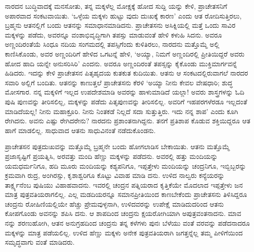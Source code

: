 ನಾರದನ ಬುದ್ಧಿವಾದಕ್ಕೆ ಮನಸೋತು, ತನ್ನ ಮಕ್ಕಳೆಲ್ಲ ಮೋಕ್ಷಕ್ಕೆ ಹೋದ ಸುದ್ದಿ ಯನ್ನು ಕೇಳಿ, ಪ್ರಾಚೇತಸನಿಗೆ ಅಪಾರವಾದ ಸಂಕಟವಾಯಿತು. ‘ಒಳ್ಳೆಯ ಮಕ್ಕಳು ಹುಟ್ಟು ವುದು ದುಃಖಕ್ಕೆ ಕಾರಣ’ ಎಂದು ಆತ ರೋದಿಸುತ್ತಿರಲು, ಬ್ರಹ್ಮನು ಆತನಲ್ಲಿಗೆ ಬಂದು ಆತನನ್ನು ಸಮಾಧಾನಮಾಡಿದನು. ಪ್ರಾಚೇತಸನು ಅಸಿಕ್ನಿಯಲ್ಲಿ ಮತ್ತೆ ಒಂದು ಸಾವಿರ ಮಕ್ಕಳನ್ನು ಪಡೆದು, ಅವರನ್ನೂ ವಂಶಾಭಿವೃದ್ಧಿಗಾಗಿ ತಪಸ್ಸು ಮಾಡುವಂತೆ ಹೇಳಿ ಕಳುಹಿ ಸಿದನು. ಅವರೂ ಅಣ್ಣಂದಿರಂತೆಯೆ ಸಿಂಧೂ ನದಿಯ ಸಂಗಮದಲ್ಲಿ ತಪಸ್ಸಿಗೆಂದು ಕುಳಿತಿರಲು, ನಾರದನು ಮತ್ತೊಮ್ಮೆ ಅಲ್ಲಿ ಕಾಣಿಸಿಕೊಂಡು, ಅವರ ಅಣ್ಣಂದಿರಿಗೆ ಹೇಳಿದ ಒಗಟನ್ನೆ ಹೇಳಿ, ‘ಅಯ್ಯಾ, ನಿಮಗೆ ಅಣ್ಣಂದಿರಲ್ಲಿ ಪ್ರೀತಿಯಿದ್ದರೆ ಅವರು ಹೋದ ಹಾದಿ ಯನ್ನೇ ಅನುಸರಿಸಿರಿ’ ಎಂದನು. ಅವರೂ ಅಣ್ಣಂದಿರಂತೆ ತಪಸ್ಸನ್ನು ಕೈಕೊಂಡು ಮುಕ್ತಿಮಾರ್ಗವನ್ನೆ ಹಿಡಿದರು. ಇದನ್ನು ಕೇಳಿ ಪ್ರಾಚೇತಸನ ಪಿತೃಹೃದಯ ಕುತಕುತ ಕುದಿಯಿತು. ಆತನು ಆ ಸಂಕಟದಲ್ಲಿರುವಾಗಲೆ ನಾರದರ ಸವಾರಿ ಅಲ್ಲಿಗೆ ಬಂದಿತು. ಆತನನ್ನು ಕಾಣುತ್ತಲೆ ಪ್ರಾಚೇತಸನು ಕೆರಳಿ ‘ಅಯ್ಯಾ ನೀನು ಕೇವಲ ವೇಷಧಾರಿ; ಶುದ್ಧ ಮೋಸಗಾರ. ನನ್ನ ಮಕ್ಕಳಿಗೆ ಇಲ್ಲದ ಉಪದೇಶಮಾಡಿ ಅವರನ್ನು ಹಾಳುಮಾಡಿದೆ ಯಲ್ಲಾ! ಅವರು ಶಾಸ್ತ್ರಗಳನ್ನು ಓದಿ ಪುಷಿ ಪುಣವನ್ನು ತೀರಿಸಲಿಲ್ಲ, ಮಕ್ಕಳನ್ನು ಪಡೆದು ಪಿತೃಪುಣವನ್ನು ತೀರಿಸಲಿಲ್ಲ. ಅವರಿಗೆ ಇಹಪರಗಳೆರಡೂ ಇಲ್ಲದಂತೆ ಮಾಡಿದೆಯಲ್ಲ! ನೀನು ಮಹಾಕ್ರೂರಿ. ನೀನು ನಿಂತಕಡೆ ನಿಲ್ಲದೆ ಸದಾ ಸುತ್ತುತ್ತಿರು. ಇದು ನನ್ನ ಶಾಪ’ ಎಂದು ಕೂಗಿ ರೇಗಿದನು. ಅವನು ಎಷ್ಟು ರೇಗಿದರೇನು? ನಾರದನು ಪ್ರಶಾಂತನಾಗಿದ್ದನು. ತನಗೆ ಪ್ರತಿಶಾಪ ಕೊಡುವ ಶಕ್ತಿಯಿದ್ದರೂ ಆತ ಹಾಗೆ ಮಾಡಲಿಲ್ಲ. ಸಾಧುವಾದ ಆತನು ಸಾಧುವಿನಂತೆ ನಡೆದುಕೊಂಡನು.

ಪ್ರಾಚೇತಸನ ಪುತ್ರದುಃಖವನ್ನು ಮತ್ತೊಮ್ಮೆ ಬ್ರಹ್ಮನೇ ಬಂದು ಹೋಗಲಾಡಿಸ ಬೇಕಾಯಿತು. ಆತನು ಮತ್ತೊಮ್ಮೆ ಪ್ರಜಾಸೃಷ್ಟಿಗೆ ಪ್ರಯತ್ನಿಸಿ, ಅರವತ್ತು ಮಂದಿ ಹೆಣ್ಣು ಮಕ್ಕಳನ್ನು ಪಡೆದನು. ಅವರಲ್ಲಿ ಹತ್ತು ಮಂದಿಯನ್ನು ಯಮಧರ್ಮನಿಗೂ, ಹದಿ ಮೂರು ಮಂದಿಯನ್ನು ಕಶ್ಯಪನಿಗೂ, ಇಪ್ಪತ್ತೇಳು ಮಂದಿಯನ್ನು ಚಂದ್ರನಿಗೂ, ಇಬ್ಬಿಬ್ಬರನ್ನು ಕ್ರಮವಾಗಿ ರುದ್ರ, ಅಂಗಿರಸ್ಸು, ಕೃಶಾಶ್ವರಿಗೂ ಕೊಟ್ಟು ವಿವಾಹ ಮಾಡಿ ದನು. ಉಳಿದ ನಾಲ್ವರು ಕನ್ಯೆಯರನ್ನು ತಾರ್ಕ್ಷ್ಯನೆಂಬ ಪುಷಿಯು ವಿಹಾಹವಾದನು. ಇವರಲ್ಲಿ ಚಂದ್ರನ ಪತ್ನಿಯರಾದ ಕೃತ್ತಿಕೆಯೇ ಮೊದಲಾದ ಇಪ್ಪತ್ತೇಳು ಜನ ಮಾತ್ರ ಪುತ್ರವತಿಯರಾಗಲಿಲ್ಲ. ಎಲ್ಲ ಮಡದಿಯರನ್ನೂ ಸಮಾನಪ್ರೀತಿಯಿಂದ ಕಾಣಬೇಕೆಂದು ಪ್ರಾಚೇತಸನು ತಿಳಿಸಿದ್ದರೂ ಚಂದ್ರನು ರೋಹಿಣಿಯಲ್ಲಿಯೇ ಹೆಚ್ಚು ಪ್ರೇಮವುಳ್ಳನಾಗಿ, ಉಳಿದವರನ್ನು ಉಪೇಕ್ಷೆ ಮಾಡಿದುದರಿಂದ ಆತನು ಕೋಪಗೊಂಡು ಅವನನ್ನು ಶಪಿಸಿ ದನು. ಆ ಶಾಪದಿಂದ ಚಂದ್ರನು ಕ್ಷಯರೋಗಿಯಾಗಿ ಅಪುತ್ರವಂತನಾದನು. ಮಾವ ನನ್ನು ಶರಣುಹೋಗಿ, ಆತನ ಅನುಗ್ರಹದಿಂದ ಚಂದ್ರನು ತನ್ನ ಕಳೆಗಳು ಪುನಃ ಬೆಳೆಯು ವಂತೆ ವರವನ್ನು ಪಡೆದನಾದರೂ ಮಕ್ಕಳನ್ನು ಮಾತ್ರ ಪಡೆಯಲಿಲ್ಲ. ಉಳಿದ ಹೆಣ್ಣು ಮಕ್ಕಳು ಅನೇಕ ಪುತ್ರವತಿಯರಾಗಿ ಜಗತ್ತನ್ನೆಲ್ಲ ತಮ್ಮ ಪೀಳಿಗೆಯಿಂದ ಸಮೃದ್ಧವಾಗು ವಂತೆ ಮಾಡಿದರು.

